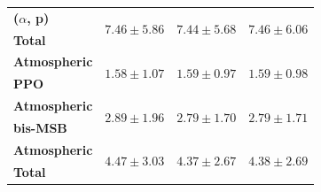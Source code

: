 \begin{table}
\begin{tabular}{lccc}
        \textbf{($\alpha$, p)} & \multirow{2}{*}{$7.46\pm5.86$} & \multirow{2}{*}{$7.44\pm5.68$} & \multirow{2}{*}{$7.46\pm6.06$} \\
        \textbf{Total} & & & \\
        \hline

        \textbf{Atmospheric} & \multirow{2}{*}{$1.58\pm1.07$} & \multirow{2}{*}{$1.59\pm0.97$} & \multirow{2}{*}{$1.59\pm0.98$} \\
        \textbf{PPO} & & & \\
        \hline

        \textbf{Atmospheric} & \multirow{2}{*}{$2.89\pm1.96$} & \multirow{2}{*}{$2.79\pm1.70$} & \multirow{2}{*}{$2.79\pm1.71$} \\
        \textbf{bis-MSB} & & & \\
        \hline

        \textbf{Atmospheric} & \multirow{2}{*}{$4.47\pm3.03$} & \multirow{2}{*}{$4.37\pm2.67$} & \multirow{2}{*}{$4.38\pm2.69$} \\
        \textbf{Total} & & & \\
        \hline

        \hline\hline
    \end{tabular}
\end{table}

